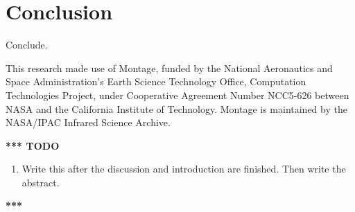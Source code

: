 \section{Conclusion}\label{mfx:conclusion}

Conclude.

This research made use of Montage, funded by the National Aeronautics and Space
Administration's Earth Science Technology Office, Computation Technologies
Project, under Cooperative Agreement Number NCC5-626 between NASA and the
California Institute of Technology. Montage is maintained by the NASA/IPAC
Infrared Science Archive.

\textbf{*** TODO}

\begin{enumerate}
\item Write this after the discussion and introduction are finished. Then
    write the abstract.
\end{enumerate}

\textbf{***}
